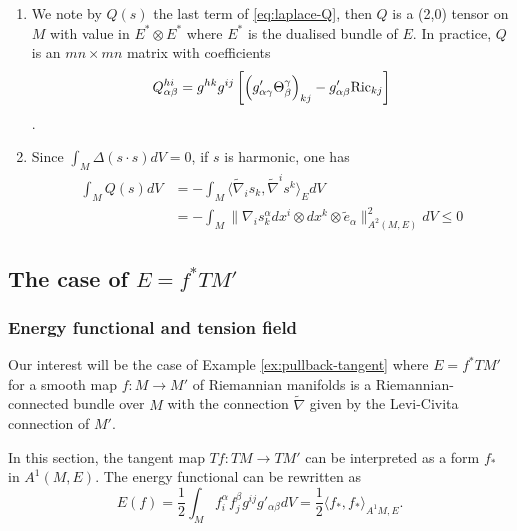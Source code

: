 \begin{remark}
\label{rem:calculs-general}
\begin{enumerate}
\item We note by \(Q(s)\) the last term of \eqref{eq:laplace-Q}, then \(Q\) is a (2,0)
tensor on \(M\) with value in \(E^*\otimes E^*\) where \(E^*\) is the dualised
bundle of \(E\). In practice, \(Q\) is an \(mn\times mn\) matrix with
coefficients \[ Q_{\alpha\beta}^{hi} = g^{hk}g^{ij}\left[ \left(g'_{\alpha\gamma} \Theta_\beta^\gamma\right)_{kj} - g'_{\alpha\beta} {\rm Ric}_{kj} \right] \].
\item Since \(\int_M \Delta(s\cdot s)dV=0\), if \(s\) is harmonic, one has
\begin{equation}
\label{eq:Q-negative}
\begin{split}
    \int_M Q(s) dV &= -\int_M \langle\tilde\nabla_i s_k,\tilde\nabla^i s^k \rangle_E dV\\
                   &= -\int_M \| \nabla_i s^\alpha_k dx^i\otimes dx^k\otimes \tilde e_\alpha\|^2_{A^2(M,E)}dV\leq 0
     \end{split}   
\end{equation}
\end{enumerate}
\end{remark}

\subsection{The case of \(E = f^* TM'\)}
\label{sec:orgfd238d8}
\label{sec:general-calcul}
\subsubsection{Energy functional and tension field}
\label{sec:orgcc3e37e}
Our interest will be the case of Example \ref{ex:pullback-tangent} where \(E =f^*TM'\) for
a smooth map \(f: M \longrightarrow M'\) of Riemannian manifolds is a
Riemannian-connected bundle over \(M\) with the connection \(\tilde\nabla\) given by
the Levi-Civita connection of \(M'\).

In this section, the tangent map \(Tf: TM \longrightarrow TM'\) can be interpreted as a form \(f_*\) in
\(A^1(M, E)\). The energy functional can be rewritten as
\[
 E(f) = \frac{1}{2}\int_M f^\alpha_i f^\beta_j g^{ij}g'_{\alpha\beta}dV =\frac{1}{2}\langle f_*, f_* \rangle_{A^1{M,E}}.
\]



